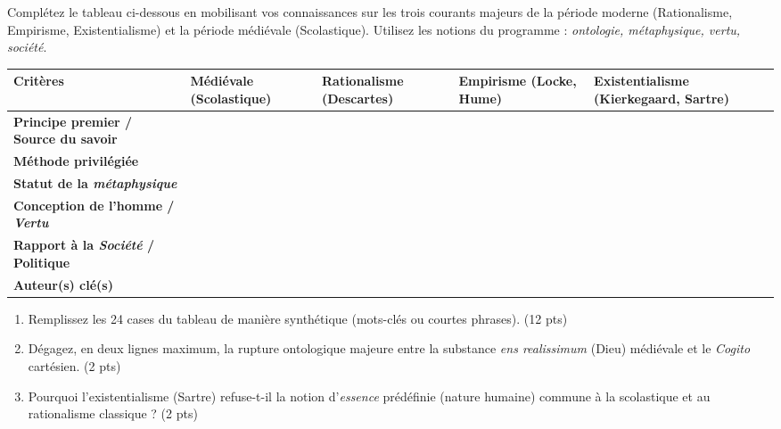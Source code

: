 \documentclass[11pt]{article}
\begin{document}
\begin{exercice}
Complétez le tableau ci-dessous en mobilisant vos connaissances sur les trois courants majeurs de la période moderne (Rationalisme, Empirisme, Existentialisme) et la période médiévale (Scolastique). Utilisez les notions du programme : \textit{ontologie, métaphysique, vertu, société}.

\begin{tabularx}{\linewidth}{|>{\bfseries}X|X|X|X|X|}
\hline
\textbf{Critères} & \textbf{Médiévale (Scolastique)} & \textbf{Rationalisme (Descartes)} & \textbf{Empirisme (Locke, Hume)} & \textbf{Existentialisme (Kierkegaard, Sartre)} \\
\hline
Principe premier / Source du savoir & & & & \\
\hline
Méthode privilégiée & & & & \\
\hline
Statut de la \textit{métaphysique} & & & & \\
\hline
Conception de l'homme / \textit{Vertu} & & & & \\
\hline
Rapport à la \textit{Société} / Politique & & & & \\
\hline
Auteur(s) clé(s) & & & & \\
\hline
\end{tabularx}

\begin{enumerate}
    \item Remplissez les 24 cases du tableau de manière synthétique (mots-clés ou courtes phrases). (12 pts)
    \item Dégagez, en deux lignes maximum, la rupture ontologique majeure entre la substance \textit{ens realissimum} (Dieu) médiévale et le \textit{Cogito} cartésien. (2 pts)
    \item Pourquoi l'existentialisme (Sartre) refuse-t-il la notion d'\textit{essence} prédéfinie (nature humaine) commune à la scolastique et au rationalisme classique ? (2 pts)
\end{enumerate}
\end{exercice}
\end{document}
